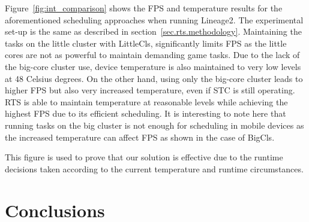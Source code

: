 Figure~\ref{fig:int_comparison} shows the FPS and temperature results for the aforementioned scheduling approaches when running Lineage2.
The experimental set-up is the same as described in section~\ref{sec.rts.methodology}. 
Maintaining the tasks on the little cluster with LittleCls, significantly limits FPS as the little cores are not as powerful to maintain demanding game tasks.
Due to the lack of the big-core cluster use, device temperature is also maintained to very low levels at 48 Celsius degrees.
On the other hand, using only the big-core cluster leads to higher FPS but also very increased temperature, even if STC is still operating.
RTS is able to maintain temperature at reasonable levels while achieving the highest FPS due to its efficient scheduling.
It is interesting to note here that running tasks on the big cluster is not enough for scheduling in mobile devices as the increased temperature can affect FPS as shown in the case of BigCls.


This figure is used to prove that our solution is effective due to the runtime decisions taken according to the current temperature and runtime circumstances.

\section{Conclusions}
